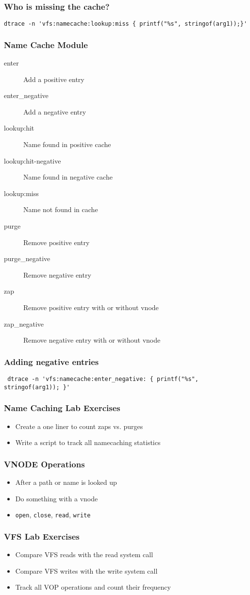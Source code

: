 \documentclass[pdftex]{beamer}
\begin{document}
\begin{frame}[fragile]
  \frametitle{Who is missing the cache?}
\begin{lstlisting}
dtrace -n 'vfs:namecache:lookup:miss { printf("%s", stringof(arg1));}'
\end{lstlisting}
\end{frame}

\begin{frame}[fragile]
  \frametitle{Name Cache Module}
  \begin{description}
  \item[enter] Add a positive entry
  \item[enter\_negative] Add a negative entry
  \item[lookup:hit] Name found in positive cache
  \item[lookup:hit-negative] Name found in negative cache
  \item[lookup:miss] Name not found in cache
  \item[purge] Remove positive entry
  \item[purge\_negative] Remove negative entry
  \item[zap] Remove positive entry with or without vnode
  \item[zap\_negative] Remove negative entry with or without vnode
  \end{description}
\end{frame}

\begin{frame}[fragile]
  \frametitle{Adding negative entries}
\begin{lstlisting}
 dtrace -n 'vfs:namecache:enter_negative: { printf("%s", stringof(arg1)); }'
\end{lstlisting}
\end{frame}

\begin{frame}
  \frametitle{Name Caching Lab Exercises}
  \begin{itemize}
  \item Create a one liner to count zaps vs. purges
  \item Write a script to track all namecaching statistics
  \end{itemize}
\end{frame}

\begin{frame}[fragile]
  \frametitle{VNODE Operations}
  \begin{itemize}
  \item After a path or name is looked up
  \item Do something with a vnode
  \item \verb|open|, \verb|close|, \verb|read|, \verb|write|
  \end{itemize}
\end{frame}

\begin{frame}
  \frametitle{VFS Lab Exercises}
  \begin{itemize}
  \item Compare VFS reads with the read system call
  \item Compare VFS writes with the write system call
  \item Track all VOP operations and count their frequency
  \end{itemize}
\end{frame}
\end{document}
